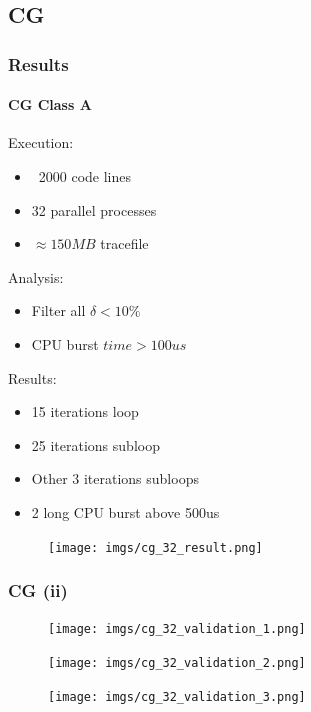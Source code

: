 \documentclass{beamer}
\begin{document}
\subsection{CG}
\begin{frame}
\frametitle{Results}
\framesubtitle{CG Class A}
\begin{multicols*}{2}
	\begin{mdframed}[backgroundcolor=blue!10,roundcorner=10pt,linewidth=0pt]
		Execution:
		\begin{itemize}
			\item ~2000 code lines
			\item 32 parallel processes
			\item $\approx150MB$ tracefile
		\end{itemize}
		Analysis:
		\begin{itemize}
			\item Filter all $\delta < 10\%$\\
			\item CPU burst $time > 100us$
		\end{itemize}
	\end{mdframed}
	\pause
	Results:
	\begin{itemize}
		\item 15 iterations loop
		\item 25 iterations subloop
		\item Other 3 iterations subloops
		\item 2 long CPU burst above 500us
	\end{itemize}
	\columnbreak
	\begin{figure}
		\texttt{[image: imgs/cg\_32\_result.png]}
	\end{figure}
\end{multicols*}
\end{frame}

\begin{frame}
\frametitle{CG (ii)}
	\begin{figure}
		\texttt{[image: imgs/cg\_32\_validation\_1.png]}
	\end{figure}
	\pause
	\begin{figure}
		\texttt{[image: imgs/cg\_32\_validation\_2.png]}
	\end{figure}
	\pause
	\begin{figure}
		\texttt{[image: imgs/cg\_32\_validation\_3.png]}
	\end{figure}
\end{frame}
\end{document}
